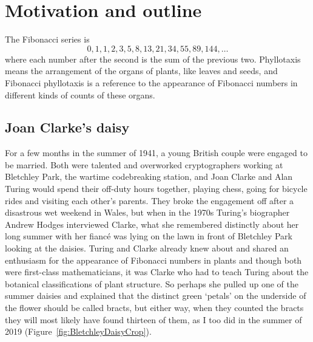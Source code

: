 

\chapter{Motivation and outline}
The Fibonacci series is
\[
0, 1, 1, 2, 3, 5,8, 13, 21, 34, 55, 89, 144, \dots
\] where each number after the second is the sum of the previous two. Phyllotaxis means the arrangement of the organs of plants, like leaves and seeds,  and Fibonacci phyllotaxis is a reference to the appearance of Fibonacci numbers in different kinds of counts of these organs. 

\section{Joan Clarke's daisy}

%
 For a few months in the summer of 1941, a young British couple were engaged to be married. Both were talented and overworked cryptographers working at Bletchley Park, the wartime codebreaking station, and  
 Joan Clarke and Alan Turing would spend their off-duty hours together, playing chess,  going for bicycle rides and visiting each other's parents. They broke the engagement off after a disastrous wet weekend in Wales, but when in the 1970s Turing's biographer Andrew Hodges interviewed Clarke, what she remembered distinctly about her long summer with her fianc\'e was lying on the lawn in front of Bletchley Park looking at the daisies. Turing and Clarke already knew about and shared an enthusiasm for the appearance of Fibonacci numbers in plants and though both were first-class mathematicians, it was Clarke who had to teach Turing about the botanical classifications of plant structure. So perhaps she  pulled up one of the summer daisies and explained that the distinct green `petals' on the underside of the flower should be called bracts, but either way, when they counted the bracts they will  most likely have found thirteen of them, as I too did in the summer of 2019 (Figure~\ref{fig:BletchleyDaisyCrop}).

